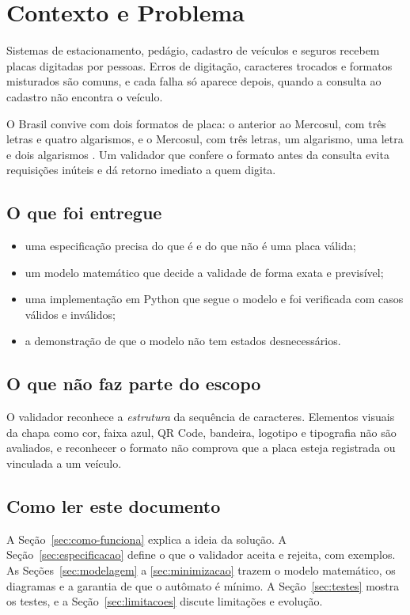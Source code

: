 \section{Contexto e Problema}
\label{sec:introducao}

Sistemas de estacionamento, pedágio, cadastro de veículos e
seguros recebem placas digitadas por pessoas. Erros de digitação,
caracteres trocados e formatos misturados são comuns, e cada falha
só aparece depois, quando a consulta ao cadastro não encontra o
veículo.

O Brasil convive com dois formatos de placa: o anterior ao
Mercosul, com três letras e quatro algarismos, e o Mercosul, com
três letras, um algarismo, uma letra e dois algarismos
\cite{contran780,contran741}. Um validador que confere o formato
antes da consulta evita requisições inúteis e dá retorno imediato
a quem digita.

\subsection{O que foi entregue}

\begin{itemize}
  \item uma especificação precisa do que é e do que não é uma placa
        válida;
  \item um modelo matemático  que
        decide a validade de forma exata e previsível;
  \item uma implementação em Python que segue o modelo e foi verificada
        com casos válidos e inválidos;
  \item a demonstração de que o modelo não tem estados desnecessários.
\end{itemize}

\subsection{O que não faz parte do escopo}

O validador reconhece a \emph{estrutura} da sequência de
caracteres. Elementos visuais da chapa como cor, faixa azul, QR Code,
bandeira, logotipo e tipografia não são avaliados, e reconhecer o
formato não comprova que a placa esteja registrada ou vinculada a
um veículo.

\subsection{Como ler este documento}

A Seção~\ref{sec:como-funciona} explica a ideia da solução.
A Seção~\ref{sec:especificacao} define o que o validador aceita e
rejeita, com exemplos. As Seções~\ref{sec:modelagem} a
\ref{sec:minimizacao} trazem o modelo matemático, os diagramas e a
garantia de que o autômato é mínimo. A Seção~\ref{sec:testes}
mostra os testes, e a Seção~\ref{sec:limitacoes} discute
limitações e evolução.